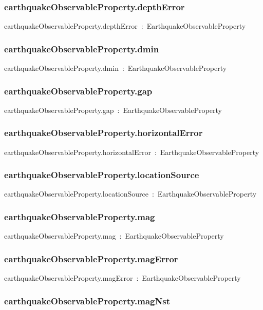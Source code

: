 \documentclass{article}
\begin{document}
\subsubsection*{earthquakeObservableProperty.depthError}

earthquakeObservableProperty.depthError~:~EarthquakeObservableProperty

\subsubsection*{earthquakeObservableProperty.dmin}

earthquakeObservableProperty.dmin~:~EarthquakeObservableProperty

\subsubsection*{earthquakeObservableProperty.gap}

earthquakeObservableProperty.gap~:~EarthquakeObservableProperty

\subsubsection*{earthquakeObservableProperty.horizontalError}

earthquakeObservableProperty.horizontalError~:~EarthquakeObservableProperty

\subsubsection*{earthquakeObservableProperty.locationSource}

earthquakeObservableProperty.locationSource~:~EarthquakeObservableProperty

\subsubsection*{earthquakeObservableProperty.mag}

earthquakeObservableProperty.mag~:~EarthquakeObservableProperty

\subsubsection*{earthquakeObservableProperty.magError}

earthquakeObservableProperty.magError~:~EarthquakeObservableProperty

\subsubsection*{earthquakeObservableProperty.magNst}
\end{document}
